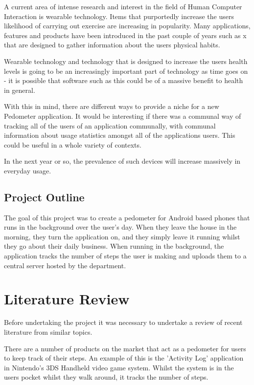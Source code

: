 \documentclass{l4proj}
\begin{document}
A current area of intense research and interest in the field of Human Computer Interaction is wearable technology. Items that purportedly increase the users likelihood of carrying out exercise are increasing in popularity. Many applications, features and products have been introduced in the past couple of years such as x that are designed to gather information about the users physical habits. 

Wearable technology and technology that is designed to increase the users health levels is going to be an increasingly important part of technology as time goes on - it is possible that software such as this could be of a massive benefit to health in general.

With this in mind, there are different ways to provide a niche for a new Pedometer application. It would be interesting if there was a communal way of tracking all of the users of an application communally, with communal information about usage statistics amongst all of the applications users. This could be useful in a whole variety of contexts.

In the next year or so, the prevalence of such devices will increase massively in everyday usage.

\section{Project Outline}

The goal of this project was to create a pedometer for Android based phones that runs in the background over the user's day. When they leave the house in the morning, they turn the application on, and they simply leave it running whilst they go about their daily business. When running in the background, the application tracks the number of steps the user is making and uploads them to a central server hosted by the department. 


\chapter{Literature Review}

Before undertaking the project it was necessary to undertake a review of recent literature from similar topics.

There are a number of products on the market that act as a pedometer for users to keep track of their steps. An example of this is the 'Activity Log' application in Nintendo's 3DS Handheld video game system. Whilst the system is in the users pocket whilst they walk around, it tracks the number of steps.
\end{document}
